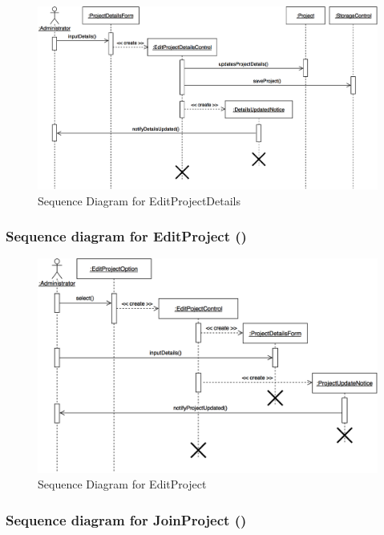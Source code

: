 \documentclass[12pt,letterpaper]{article}
\begin{document}
\begin{figure}[H]
	\centering{}
	\includegraphics[scale=0.3]{imgs/seq/edit-project-details.png}
	\caption{Sequence Diagram for EditProjectDetails}
\end{figure}

\subsubsection*{Sequence diagram for EditProject (\editproject{})}

\begin{figure}[H]
	\centering{}
	\includegraphics[scale=0.3]{imgs/seq/edit-project.png}
	\caption{Sequence Diagram for EditProject}
\end{figure}

\subsubsection*{Sequence diagram for JoinProject (\joinproject{})}
\end{document}
